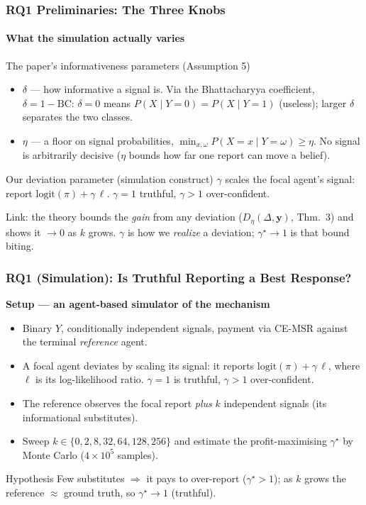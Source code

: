 \documentclass[
	11pt, %
]{beamer}
\begin{document}
\begin{frame}
	\frametitle{RQ1 Preliminaries: The Three Knobs}
	\framesubtitle{What the simulation actually varies}
	\small

	\begin{block}{The paper's informativeness parameters (Assumption 5)}
		\begin{itemize}
			\item $\delta$ --- \alert{how informative} a signal is.
			Via the Bhattacharyya coefficient, $\delta = 1-\mathrm{BC}$:
			$\delta = 0$ means $P(X\mid Y{=}0)=P(X\mid Y{=}1)$ (useless);
			larger $\delta$ separates the two classes.
			\item $\eta$ --- a \alert{floor on signal probabilities},
			$\min_{x,\omega} P(X{=}x\mid Y{=}\omega)\ge\eta$.
			No signal is arbitrarily decisive ($\eta$ bounds how far one report can move a belief).
		\end{itemize}
	\end{block}

	\begin{block}{Our deviation parameter (simulation construct)}
		$\gamma$ scales the focal agent's signal: report
		$\mathrm{logit}(\pi) + \gamma\,\ell$.
		$\gamma=1$ truthful, $\gamma>1$ over-confident.
	\end{block}

	\centering
	\alert{Link:} the theory bounds the \emph{gain} from any deviation
	($D_\eta(\Delta,\mathbf{y})$, Thm.~3) and shows it $\to 0$ as $k$ grows.
	$\gamma$ is how we \emph{realize} a deviation; $\gamma^\star\!\to\!1$ is that bound biting.
\end{frame}

\begin{frame}
	\frametitle{RQ1 (Simulation): Is Truthful Reporting a Best Response?}

	\textbf{Setup --- an agent-based simulator of the mechanism}
	\begin{itemize}
		\item Binary $Y$, conditionally independent signals, payment via CE-MSR against the terminal \emph{reference} agent.
		\item A focal agent deviates by scaling its signal: it reports $\mathrm{logit}(\pi) + \gamma\,\ell$, where $\ell$ is its log-likelihood ratio. $\gamma=1$ is truthful, $\gamma>1$ over-confident.
		\item The reference observes the focal report \emph{plus} $k$ independent signals (its informational substitutes).
		\item Sweep $k \in \{0,2,8,32,64,128,256\}$ and estimate the profit-maximising $\gamma^\star$ by Monte Carlo ($4\times 10^5$ samples).
	\end{itemize}

	\begin{block}{Hypothesis}
		Few substitutes $\Rightarrow$ it pays to over-report ($\gamma^\star>1$); as $k$ grows the reference $\approx$ ground truth, so $\gamma^\star \to 1$ (truthful).
	\end{block}
\end{frame}
\end{document}

